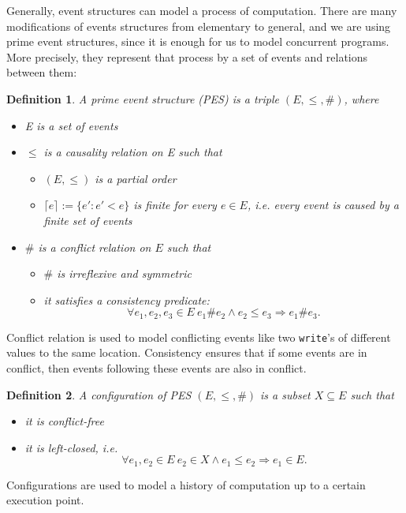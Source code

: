 \documentclass[conference]{IEEEtran}
\newtheorem{definition}{Definition}
\begin{document}
Generally, event structures can model a process of computation. 
There are many modifications of events structures from elementary to general, 
and we are using prime event structures, since it is enough for us to model 
concurrent programs. More precisely, they represent that process by a set of events 
and relations between them: 
\begin{definition}
A prime event structure (PES) is a triple $(E, \leq, \#)$, where
\begin{itemize}
  \item E is a set of events
  \item $\leq$ is a causality relation on E such that 
  \begin{itemize}
    \item $ (E, \leq) $ is a partial order
    \item $\lceil e \rceil := \{ e' : e' < e \}$ is finite for every $e \in E$, 
    i.e. every event is caused by a finite set of events
  \end{itemize}
  \item $\#$ is a conflict relation on $E$ such that
  \begin{itemize}
    \item $\#$ is irreflexive and symmetric
    \item it satisfies a consistency predicate:
    $$\forall e_1, e_2, e_3 \in E \ e_1 \# e_2 \land e_2 \leq e_3 \Rightarrow e_1 \# e_3.$$
  \end{itemize}
\end{itemize}
\end{definition}

Conflict relation is used to model conflicting events like two \texttt{write}'s 
of different values to the same location.
Consistency ensures that if some events are in conflict, then events 
following these events are also in conflict.

\begin{definition}
A configuration of PES $(E, \leq, \#)$ is a subset $X \subseteq E$ such that
\begin{itemize}
  \item it is conflict-free
  \item it is left-closed, i.e. $$\forall e_1, e_2 \in E \ e_2 \in X \land e_1 \leq e_2 \Rightarrow e_1 \in E.$$
\end{itemize}
\end{definition}

Configurations are used to model a history of computation up to a certain 
execution point.
\end{document}
